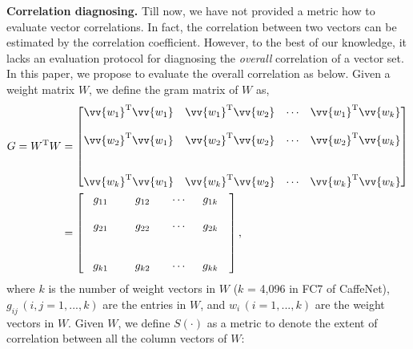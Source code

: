 \documentclass[10pt,twocolumn,letterpaper]{article}
\begin{document}
\textbf{Correlation diagnosing.} Till now, we have not provided a metric how to evaluate vector correlations.  In fact, the correlation between two vectors can be estimated by the correlation coefficient. However, to the best of our knowledge, it lacks an evaluation protocol for diagnosing the \emph{overall} correlation of a vector set. In this paper, we propose to evaluate the overall correlation as below. Given a weight matrix $W$, we define the gram matrix of $W$ as,
\begin{align}
G=W^\mathrm{T}W
&=\begin{bmatrix}
\vv{w_1}^\mathrm{T}\vv{w_1} &\vv{w_1}^\mathrm{T}\vv{w_2} &\cdots &\vv{w_1}^\mathrm{T}\vv{w_k}\\
\\
\vv{w_2}^\mathrm{T}\vv{w_1} &\vv{w_2}^\mathrm{T}\vv{w_2} &\cdots &\vv{w_2}^\mathrm{T}\vv{w_k}\\
\\
\\
\vv{w_k}^\mathrm{T}\vv{w_1} &\vv{w_k}^\mathrm{T}\vv{w_2} &\cdots &\vv{w_k}^\mathrm{T}\vv{w_k}\end{bmatrix}\nonumber\\
&=\begin{bmatrix} 
\hspace{0.30cm} g_{11} & \hspace{0.50cm} g_{12} &\hspace{0.35cm}\cdots&\hspace{0.20cm} g_{1k} $\quad$ \\
\\
\hspace{0.30cm} g_{21} & \hspace{0.50cm} g_{22} &\hspace{0.35cm}\cdots&\hspace{0.20cm} g_{2k} $\quad$ \\
\\
\\
\hspace{0.30cm} g_{k1} & \hspace{0.50cm} g_{k2} &\hspace{0.35cm}\cdots&\hspace{0.20cm} g_{kk} $\quad$ 
\end{bmatrix},
\end{align}    
where $k$ is the number of weight vectors in $W$ ($k$ = 4,096 in FC7 of CaffeNet), $g_{ij}\,(i,j = 1,...,k)$ are the entries in $W$, and $w_i\,(i=1,...,k)$ are the weight vectors in $W$. Given $W$, we define  $S(\cdot)$ as a metric to denote the extent of correlation between all the column vectors of $W$: 
\end{document}
